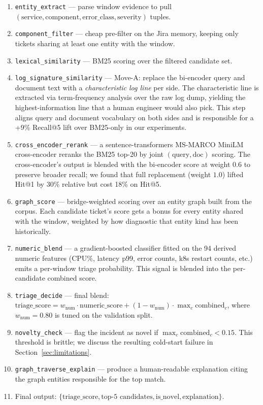 \begin{enumerate}
    \item \texttt{entity\_extract} --- parse window evidence to pull $(\text{service}, \text{component}, \text{error\_class}, \text{severity})$ tuples.
    \item \texttt{component\_filter} --- cheap pre-filter on the Jira memory, keeping only tickets sharing at least one entity with the window.
    \item \texttt{lexical\_similarity} --- BM25 scoring over the filtered candidate set.
    \item \texttt{log\_signature\_similarity} --- Move-A: replace the bi-encoder query and document text with a \emph{characteristic log line} per side. The characteristic line is extracted via term-frequency analysis over the raw log dump, yielding the highest-information line that a human engineer would also pick. This step aligns query and document vocabulary on both sides and is responsible for a +9\% Recall@5 lift over BM25-only in our experiments.
    \item \texttt{cross\_encoder\_rerank} --- a sentence-transformers MS-MARCO MiniLM cross-encoder reranks the BM25 top-20 by joint $(\text{query}, \text{doc})$ scoring. The cross-encoder's output is blended with the bi-encoder score at weight $0.6$ to preserve broader recall; we found that full replacement (weight $1.0$) lifted Hit@1 by 30\% relative but cost 18\% on Hit@5.
    \item \texttt{graph\_score} --- bridge-weighted scoring over an entity graph built from the corpus. Each candidate ticket's score gets a bonus for every entity shared with the window, weighted by how diagnostic that entity kind has been historically.
    \item \texttt{numeric\_blend} --- a gradient-boosted classifier fitted on the 94 derived numeric features (CPU\%, latency p99, error counts, k8s restart counts, etc.) emits a per-window triage probability. This signal is blended into the per-candidate combined score.
    \item \texttt{triage\_decide} --- final blend: $\text{triage\_score} = w_{\text{num}} \cdot \text{numeric\_score} + (1 - w_{\text{num}}) \cdot \max_{c} \text{combined}_c$, where $w_{\text{num}} = 0.80$ is tuned on the validation split.
    \item \texttt{novelty\_check} --- flag the incident as novel if $\max_c \text{combined}_c < 0.15$. This threshold is brittle; we discuss the resulting cold-start failure in Section~\ref{sec:limitations}.
    \item \texttt{graph\_traverse\_explain} --- produce a human-readable explanation citing the graph entities responsible for the top match.
    \item Final output: $\{\text{triage\_score}, \text{top-5 candidates}, \text{is\_novel}, \text{explanation}\}$.
\end{enumerate}

